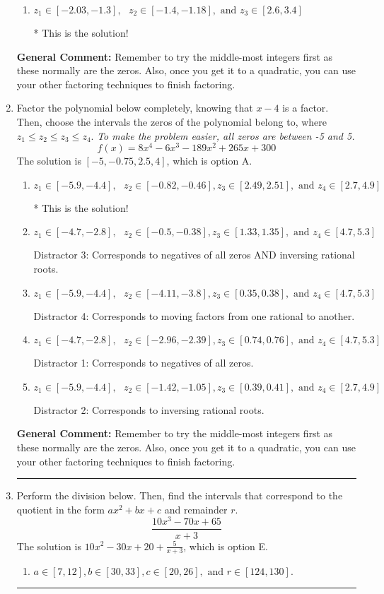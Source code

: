 \documentclass{extbook}[14pt]
\newcommand{\litem}[1]{\item #1

\rule{\textwidth}{0.4pt}}
\begin{document}
\begin{enumerate}
{\begin{enumerate}[label=\Alph*.]
 Distractor 4: Corresponds to moving factors from one rational to another.
\item \( z_1 \in [-2.03, -1.3], \text{   }  z_2 \in [-1.4, -1.18], \text{   and   } z_3 \in [2.6, 3.4] \)

* This is the solution!
\end{enumerate}

\textbf{General Comment:} Remember to try the middle-most integers first as these normally are the zeros. Also, once you get it to a quadratic, you can use your other factoring techniques to finish factoring.
}
\litem{
Factor the polynomial below completely, knowing that $x -4$ is a factor. Then, choose the intervals the zeros of the polynomial belong to, where $z_1 \leq z_2 \leq z_3 \leq z_4$. \textit{To make the problem easier, all zeros are between -5 and 5.}
\[ f(x) = 8x^{4} -6 x^{3} -189 x^{2} +265 x + 300 \]The solution is \( [-5, -0.75, 2.5, 4] \), which is option A.\begin{enumerate}[label=\Alph*.]
\item \( z_1 \in [-5.9, -4.4], \text{   }  z_2 \in [-0.82, -0.46], z_3 \in [2.49, 2.51], \text{   and   } z_4 \in [2.7, 4.9] \)

* This is the solution!
\item \( z_1 \in [-4.7, -2.8], \text{   }  z_2 \in [-0.5, -0.38], z_3 \in [1.33, 1.35], \text{   and   } z_4 \in [4.7, 5.3] \)

 Distractor 3: Corresponds to negatives of all zeros AND inversing rational roots.
\item \( z_1 \in [-5.9, -4.4], \text{   }  z_2 \in [-4.11, -3.8], z_3 \in [0.35, 0.38], \text{   and   } z_4 \in [4.7, 5.3] \)

 Distractor 4: Corresponds to moving factors from one rational to another.
\item \( z_1 \in [-4.7, -2.8], \text{   }  z_2 \in [-2.96, -2.39], z_3 \in [0.74, 0.76], \text{   and   } z_4 \in [4.7, 5.3] \)

 Distractor 1: Corresponds to negatives of all zeros.
\item \( z_1 \in [-5.9, -4.4], \text{   }  z_2 \in [-1.42, -1.05], z_3 \in [0.39, 0.41], \text{   and   } z_4 \in [2.7, 4.9] \)

 Distractor 2: Corresponds to inversing rational roots.
\end{enumerate}

\textbf{General Comment:} Remember to try the middle-most integers first as these normally are the zeros. Also, once you get it to a quadratic, you can use your other factoring techniques to finish factoring.
}
\litem{
Perform the division below. Then, find the intervals that correspond to the quotient in the form $ax^2+bx+c$ and remainder $r$.
\[ \frac{10x^{3} -70 x + 65}{x + 3} \]The solution is \( 10x^{2} -30 x + 20 + \frac{5}{x + 3} \), which is option E.\begin{enumerate}[label=\Alph*.]
\item \( a \in [7, 12], b \in [30, 33], c \in [20, 26], \text{ and } r \in [124, 130]. \)


\end{enumerate}}
\end{enumerate}
\end{document}
